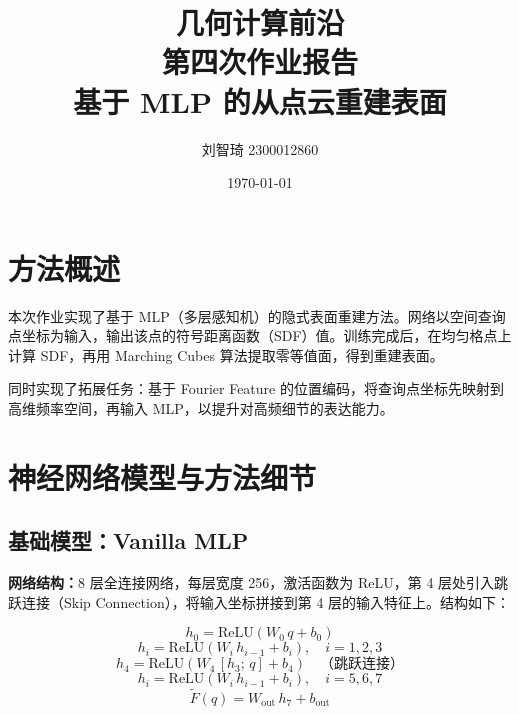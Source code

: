 \documentclass[12pt, a4paper]{article}
\title{几何计算前沿\\第四次作业报告\\基于 MLP 的从点云重建表面}
\author{刘智琦 2300012860}
\date{\today}
\begin{document}
\maketitle
\tableofcontents
\newpage

\section{方法概述}

本次作业实现了基于 MLP（多层感知机）的隐式表面重建方法。网络以空间查询点坐标为输入，输出该点的符号距离函数（SDF）值。训练完成后，在均匀格点上计算 SDF，再用 Marching Cubes 算法提取零等值面，得到重建表面。

同时实现了拓展任务：基于 Fourier Feature 的位置编码，将查询点坐标先映射到高维频率空间，再输入 MLP，以提升对高频细节的表达能力。

\section{神经网络模型与方法细节}

\subsection{基础模型：Vanilla MLP}

\textbf{网络结构：}8 层全连接网络，每层宽度 256，激活函数为 ReLU，第 4 层处引入跳跃连接（Skip Connection），将输入坐标拼接到第 4 层的输入特征上。结构如下：

\begin{equation}
  h_0 = \text{ReLU}(W_0 \, q + b_0)
\end{equation}
\begin{equation}
  h_i = \text{ReLU}(W_i \, h_{i-1} + b_i), \quad i = 1,2,3
\end{equation}
\begin{equation}
  h_4 = \text{ReLU}(W_4 \, [h_3;\, q] + b_4)  \quad \text{（跳跃连接）}
\end{equation}
\begin{equation}
  h_i = \text{ReLU}(W_i \, h_{i-1} + b_i), \quad i = 5,6,7
\end{equation}
\begin{equation}
  \tilde{F}(q) = W_{\text{out}} \, h_7 + b_{\text{out}}
\end{equation}
\end{document}
